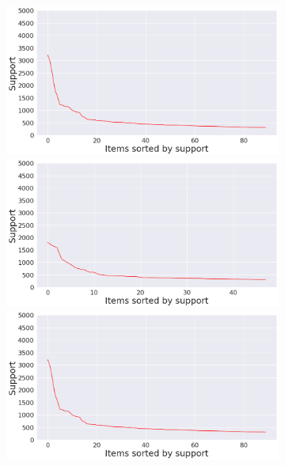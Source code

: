 \documentclass[12pt,%
               a4paper,%
               oneside,openany,%
               titlepage,%
               headinclude,footinclude,%
               BCOR5mm,%
               cleardoublepage=empty,%
               tablecaptionabove,%
               floatperchapter,
               ]{scrreprt}                 %
\begin{document}
\begin{figure}[ht]
\begin{minipage}[b]{0.5\linewidth}
\begin{figure}[ht]
\begin{minipage}[b]{0.5\linewidth}
\centering
 \includegraphics[width=.9\linewidth]{Figures/Support_distrubution_Rareearth.png}
 \vspace{4ex}
\end{minipage}
  \begin{minipage}[b]{0.5\linewidth}
    \centering
    \includegraphics[width=.9\linewidth]{Figures/Support_distrubution_Afghanistan.png}
    \vspace{4ex}
  \end{minipage}%
    \begin{minipage}[b]{0.5\linewidth}
   \centering
    \includegraphics[width=.9\linewidth]{Figures/Support_distrubution_Rareearth.png} 

\end{minipage}
\end{figure}
\end{minipage}
\end{figure}
\end{document}
